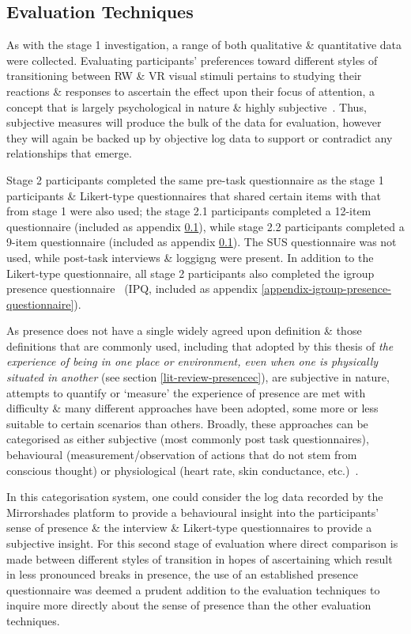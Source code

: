 
\subsection{Evaluation Techniques}

As with the stage 1 investigation, a range of both qualitative \& quantitative data were collected. Evaluating participants' preferences toward different styles of transitioning between RW \& VR visual stimuli pertains to studying their reactions \& responses to ascertain the effect upon their focus of attention, a concept that is largely psychological in nature \& highly subjective~\cite{Ijsselsteijn2001}. Thus, subjective measures will produce the bulk of the data for evaluation, however they will again be backed up by objective log data to support or contradict any relationships that emerge.

Stage 2 participants completed the same pre-task questionnaire as the stage 1 participants \& Likert-type questionnaires that shared certain items with that from stage 1 were also used; the stage 2.1 participants completed a 12-item questionnaire (included as appendix \ref{}), while stage 2.2 participants completed a 9-item questionnaire (included as appendix \ref{}). The SUS questionnaire was not used, while post-task interviews \& loggigng were present. In addition to the Likert-type questionnaire, all stage 2 participants also completed the igroup presence questionnaire~\cite{Schubert2001} (IPQ, included as appendix \ref{appendix-igroup-presence-questionnaire}).

As presence does not have a single widely agreed upon definition \& those definitions that are commonly used, including that adopted by this thesis of \textit{the experience of being in one place or environment, even when one is physically situated in another} (see section \ref{lit-review-presencec}), are subjective in nature, attempts to quantify or `measure' the experience of presence are met with difficulty \& many different approaches have been adopted, some more or less suitable to certain scenarios than others. Broadly, these approaches can be categorised as either subjective (most commonly post task questionnaires), behavioural (measurement/observation of actions that do not stem from conscious thought) or physiological (heart rate, skin conductance, etc.)~\cite{Insko2003}.

In this categorisation system, one could consider the log data recorded by the Mirrorshades platform to provide a behavioural insight into the participants' sense of presence \& the interview \& Likert-type questionnaires to provide a subjective insight. For this second stage of evaluation where direct comparison is made between different styles of transition in hopes of ascertaining which result in less pronounced breaks in presence, the use of an established presence questionnaire was deemed a prudent addition to the evaluation techniques to inquire more directly about the sense of presence than the other evaluation techniques.

